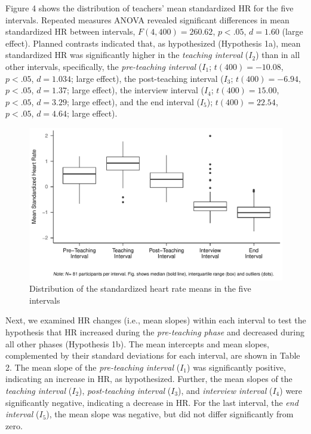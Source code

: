 \documentclass[preprint, 3p,
sort,]{elsarticle} %
\begin{document}
\newpage

Figure 4 shows the distribution of teachers' mean standardized HR for
the five intervals. Repeated measures ANOVA revealed significant
differences in mean standardized HR between intervals,
\(F(4, 400) = 260.62\), \(p < .05\), \(d = 1.60\) (large effect).
Planned contrasts indicated that, as hypothesized (Hypothesis 1a), mean
standardized HR was significantly higher in the \emph{teaching interval}
(\(I_2\)) than in all other intervals, specifically, the
\emph{pre-teaching interval} (\(I_1\); \(t(400) = -10.08\), \(p < .05\),
\(d = 1.034\); large effect), the post-teaching interval (\(I_3\);
\(t(400) = -6.94\), \(p < .05\), \(d = 1.37\); large effect), the
interview interval (\(I_4\); \(t(400) = 15.00\), \(p < .05\),
\(d = 3.29\); large effect), and the end interval (\(I_5\));
\(t(400) = 22.54\), \(p < .05\), \(d = 4.64\); large effect).

\begin{figure}[H]
  \centering
  \includegraphics[width=1\textwidth]{plots_publication/box_plot.pdf}
  \caption{Distribution of the standardized heart rate means in the five intervals}
  \label{Distribution of the standardized heart rate means in the five intervals}
\end{figure}

Next, we examined HR changes (i.e., mean slopes) within each interval to
test the hypothesis that HR increased during the \emph{pre-teaching
phase} and decreased during all other phases (Hypothesis 1b). The mean
intercepts and mean slopes, complemented by their standard deviations
for each interval, are shown in Table 2. The mean slope of the
\emph{pre-teaching interval} (\(I_1\)) was significantly positive,
indicating an increase in HR, as hypothesized. Further, the mean slopes
of the \emph{teaching interval} (\(I_2\)), \emph{post-teaching interval}
(\(I_3\)), and \emph{interview interval} (\(I_4\)) were significantly
negative, indicating a decrease in HR. For the last interval, the
\emph{end interval} (\(I_5\)), the mean slope was negative, but did not
differ significantly from zero.
\end{document}

